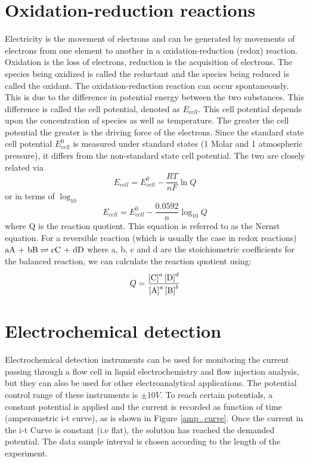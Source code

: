 \documentclass[twoside,single]{lion-msc}
\begin{document}
\section{Oxidation-reduction reactions}
Electricity is the movement of electrons and can be generated by movements of electrons from one element to another in a oxidation-reduction (redox) reaction. Oxidation is the loss of electrons, reduction is the acquisition of electrons. The species being oxidized is called the reductant and the species being reduced is called the oxidant. The oxidation-reduction reaction can occur spontaneously. This is due to the difference in potential energy between the two substances. This difference is called the cell potential, denoted as $E_{cell}$. This cell potential depends upon the concentration of species as well as temperature. The greater the cell potential the greater is the driving force of the electrons. Since the standard state cell potential $E^{0}_{cell}$ is measured under standard states (1 Molar and 1 atmospheric pressure), it differs from the non-standard state cell potential. The two are closely related via
\begin{equation} \label{nernst}
E_{cell} = E^{0}_{cell} - \frac{RT}{nF} \ln Q
\end{equation}
or in terms of $\log_{10}$
\begin{equation}
E_{cell} = E^{0}_{cell} - \frac{0.0592}{n} \log_{10} Q
\end{equation}
where Q is the reaction quotient. This equation is referred to as the Nernst equation. For a reversible reaction (which is usually the case in redox reactions) $\textup{aA + bB}\rightleftharpoons\textup{cC + dD}$ where a, b, c and d are the stoichiometric coefficients for the balanced reaction, we can calculate the reaction quotient using:
\begin{equation}
Q=\frac{\left [\textup{C}  \right ]^{a}\left [\textup{D}  \right ]^{d}}{\left [\textup{A}  \right ]^{a}\left [\textup{B}  \right ]^{b}}
\end{equation}

\section{Electrochemical detection}
Electrochemical detection instruments can be used for monitoring the current passing through a flow cell in liquid electrochemistry and flow injection analysis, but they can also be used for other electroanalytical applications. The potential control range of these instruments is $\pm10V$. To reach certain potentials, a constant potential is applied and the current is recorded as function of time (amperometric i-t curve), as is shown in Figure \ref{amp_curve}. Once the current in the i-t Curve is constant (i.e flat), the solution has reached the demanded potential. The data sample interval is chosen according to the length of the experiment.
\end{document}
